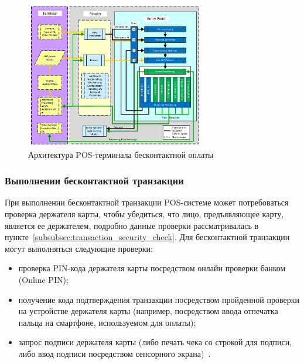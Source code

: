 \begin{figure}[H]
    \centering
    \includegraphics[width=0.7\textwidth]{images/research/pos_design_example}
    \caption{\centering Архитектура POS-терминала бесконтактной оплаты}
    \label{fig:pos_design_example}
\end{figure}



\subsubsection{Выполнении бесконтактной транзакции}

При выполнении бесконтактной транзакции POS-системе может потребоваться проверка держателя карты, чтобы убедиться, что лицо, предъявляющее карту, является ее держателем, подробно данные проверки рассматривалась в пункте~\ref{subsubsec:transaction_security_check}.
Для бесконтактной транзакции могут выполняться следующие проверки:

\begin{itemize}
    \item проверка PIN-кода держателя карты посредством онлайн проверки банком (Online PIN);
    \item получение кода подтверждения транзакции посредством пройденной проверки на устройстве держателя карты (например, посредством ввода отпечатка пальца на смартфоне, используемом для оплаты);
    \item запрос подписи держателя карты (либо печать чека со строкой для подписи, либо ввод подписи посредством сенсорного экрана)~\cite{emv_book_A}.
\end{itemize}

